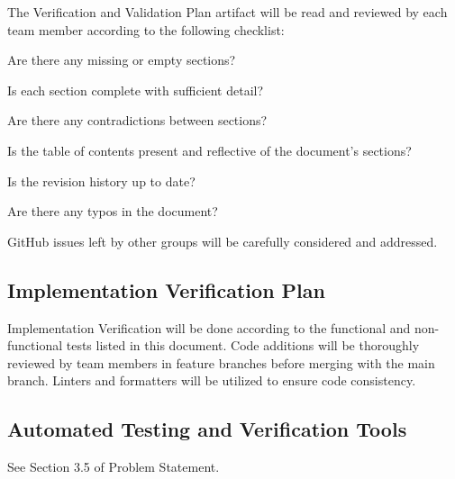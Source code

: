 \documentclass[12pt, titlepage]{article}
\begin{document}
	The Verification and Validation Plan artifact will be read and reviewed by each team member according to the following checklist:
	\begin{todolist}
		\item Are there any missing or empty sections?
		\item Is each section complete with sufficient detail?
		\item Are there any contradictions between sections?
		\item Is the table of contents present and reflective of the document's sections?
		\item Is the revision history up to date?
		\item Are there any typos in the document?
	\end{todolist}
	GitHub issues left by other groups will be carefully considered and addressed.
	
	\subsection{Implementation Verification Plan}
	
	

	Implementation Verification will be done according to the functional and non-functional tests listed in this document.
	Code additions will be thoroughly reviewed by team members in feature branches before merging with the main branch.
	Linters and formatters will be utilized to ensure code consistency.
	
	\subsection{Automated Testing and Verification Tools}
	
	See Section 3.5 of Problem Statement.
	
\end{document}
